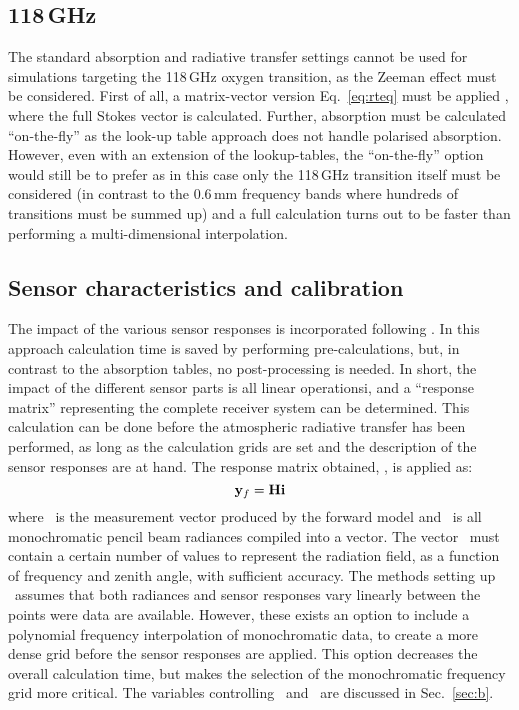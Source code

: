 \subsection{118\,GHz}
%
The standard absorption and radiative transfer settings cannot be used for
simulations targeting the 118\,GHz oxygen transition, as the Zeeman effect must
be considered. First of all, a matrix-vector version Eq.~\ref{eq:rteq} must be
applied \citep{larsson:zeema:14}, where the full Stokes vector is calculated.
Further, absorption must be calculated ``on-the-fly'' as the look-up table
approach does not handle polarised absorption. However, even with an extension
of the lookup-tables, the ``on-the-fly'' option would still be to prefer as in
this case only the 118\,GHz transition itself must be considered (in contrast
to the 0.6\,mm frequency bands where hundreds of transitions must be summed
up) and a full calculation turns out to be faster than performing a
multi-dimensional interpolation.


\subsection{Sensor characteristics and calibration}
%
The impact of the various sensor responses is incorporated following
\citet{eriksson:06}. In this approach calculation time is saved by
performing pre-calculations, but, in contrast to the absorption tables, no
post-processing is needed. In short, the impact of the different sensor parts
is all linear operationsi, and a ``response matrix'' representing the complete
receiver system can be determined. This calculation can be done before the
atmospheric radiative transfer has been performed, as long as the calculation
grids are set and the description of the sensor responses are at hand. The
response matrix obtained, \SnsMtr, is applied as:
\begin{equation}
  \label{eq:H}
  \mathbf{y}_{f} = \mathbf{H}\mathbf{i}
\end{equation}
where \ is the measurement vector produced by the forward model and
\MpiVct\ is all monochromatic pencil beam radiances compiled into a vector. The
vector \MpiVct\ must contain a certain number of values to represent the
radiation field, as a function of frequency and zenith angle, with sufficient
accuracy. The methods setting up \SnsMtr\ assumes that both radiances and
sensor responses vary linearly between the points were data are available.
However, these exists an option to include a polynomial frequency interpolation
of monochromatic data, to create a more dense grid before the sensor responses
are applied. This option decreases the overall calculation time, but makes the
selection of the monochromatic frequency grid more critical. The variables
controlling \SnsMtr\ and \MpiVct\ are discussed in Sec.~\ref{sec:b}.

